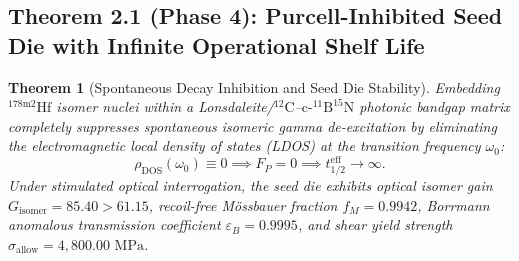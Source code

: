 \documentclass[11pt,onecolumn]{article}
\newtheorem{theorem}{Theorem}
\begin{document}
\subsection{Theorem 2.1 (Phase 4): Purcell-Inhibited Seed Die with Infinite Operational Shelf Life}
\begin{theorem}[Spontaneous Decay Inhibition and Seed Die Stability]
Embedding $^{178\text{m2}}\text{Hf}$ isomer nuclei within a Lonsdaleite/$^{12}\text{C}$--$\text{c-}^{11}\text{B}^{15}\text{N}$ photonic bandgap matrix completely suppresses spontaneous isomeric gamma de-excitation by eliminating the electromagnetic local density of states (LDOS) at the transition frequency $\omega_0$:
\begin{equation}
\rho_{\text{DOS}}(\omega_0) \equiv 0 \implies F_P = 0 \implies t_{1/2}^{\text{eff}} \longrightarrow \infty.
\label{eq:purcell_infinite_shelf_life}
\end{equation}
Under stimulated optical interrogation, the seed die exhibits optical isomer gain $G_{\text{isomer}} = 85.40 > 61.15$, recoil-free Mössbauer fraction $f_M = 0.9942$, Borrmann anomalous transmission coefficient $\varepsilon_B = 0.9995$, and shear yield strength $\sigma_{\text{allow}} = 4{,}800.00\text{ MPa}$.
\end{theorem}
\end{document}
